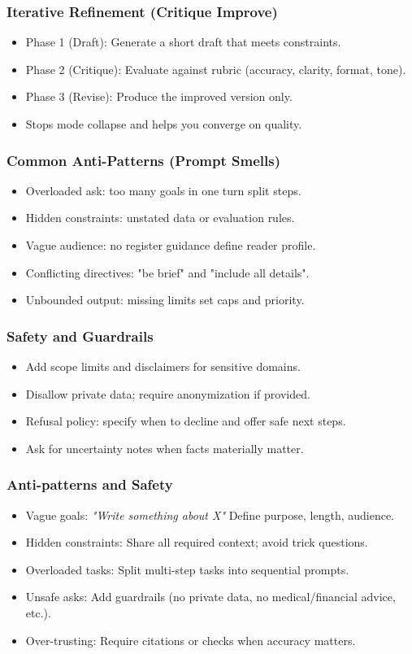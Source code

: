 \documentclass{beamer}
\begin{document}
\begin{frame}
	\frametitle{Iterative Refinement (Critique \textrightarrow{} Improve)}
	\begin{itemize}
		\item Phase 1 (Draft): Generate a short draft that meets constraints.
		\item Phase 2 (Critique): Evaluate against rubric (accuracy, clarity, format, tone).
		\item Phase 3 (Revise): Produce the improved version only.
		\item Stops mode collapse and helps you converge on quality.
	\end{itemize}
\end{frame}

\begin{frame}
	\frametitle{Common Anti-Patterns (Prompt Smells)}
	\begin{itemize}
		\item Overloaded ask: too many goals in one turn \textrightarrow{} split steps.
		\item Hidden constraints: unstated data or evaluation rules.
		\item Vague audience: no register guidance \textrightarrow{} define reader profile.
		\item Conflicting directives: "be brief" and "include all details".
		\item Unbounded output: missing limits \textrightarrow{} set caps and priority.
	\end{itemize}
\end{frame}

\begin{frame}
	\frametitle{Safety and Guardrails}
	\begin{itemize}
		\item Add scope limits and disclaimers for sensitive domains.
		\item Disallow private data; require anonymization if provided.
		\item Refusal policy: specify when to decline and offer safe next steps.
		\item Ask for uncertainty notes when facts materially matter.
	\end{itemize}
\end{frame}

\begin{frame}
	\frametitle{Anti-patterns and Safety}
	\begin{itemize}
		\item Vague goals: \textit{"Write something about X"} \textrightarrow{} Define purpose, length, audience.
		\item Hidden constraints: Share all required context; avoid trick questions.
		\item Overloaded tasks: Split multi-step tasks into sequential prompts.
		\item Unsafe asks: Add guardrails (no private data, no medical/financial advice, etc.).
		\item Over-trusting: Require citations or checks when accuracy matters.
	\end{itemize}
\end{frame}
\end{document}
